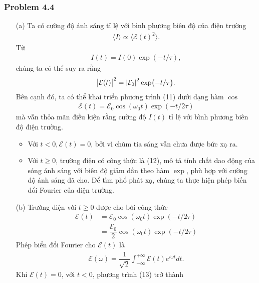 \documentclass{report}
\newcommand{\f}[2]{\dfrac{#1}{#2}}
\begin{document}
\subsubsection*{Problem 4.4}
\begin{enumerate}
	\item[(a)] Ta có cường độ ánh sáng tỉ lệ với bình phương biên độ của điện trường
	      \begin{align}
		      \langle I \rangle \propto  \langle \mathcal{E}(t)^2 \rangle.
	      \end{align}
	      Từ
	      \begin{align}
		      I(t) = I(0) \exp(-t/\tau),
	      \end{align}
	      chúng ta có thể suy ra rằng
	      \begin{align}
		      \abs{\mathcal{E}(t)}^2 = \abs{\mathcal{E}_0}^2 \exp(-t/\tau).
	      \end{align}
	      Bên cạnh đó, ta có thể khai triển phương trình (11) dưới dạng hàm $\cos$
	      \begin{align}
		      \mathcal{E}(t) = \mathcal{E}_0 \cos(\omega_0 t) \exp(-t/2\tau)
	      \end{align}
	      mà vẫn thỏa mãn điều kiện rằng cường độ $I(t)$ tỉ lệ với bình phương biên độ điện trường.
	      \begin{itemize}
		      \item Với $t<0, \mathcal{E}(t) = 0$, bởi vì chùm tia sáng vẫn chưa được bức xạ ra.
		      \item Với $t \geq 0$, trường điện có công thức là (12), mô tả tính chất dao động của sóng ánh sáng với biên độ giảm dần theo hàm $\exp$, phù hợp với cường độ ánh sáng đã cho. Để tìm phổ phát xạ, chúng ta thực hiện phép biến đổi Fourier của điện trường.
	      \end{itemize}
	\item[(b)] Trường điện với $t \geq 0$ được cho bởi công thức
	      \begin{align*}
		      \mathcal{E}(t)
		       & = \mathcal{E}_0 \cos(\omega_0 t) \exp(-t/2\tau)        \\
		       & = \f{\mathcal{E}_0}{2} \cos(\omega_0 t) \exp(-t/2\tau)
	      \end{align*}
	      Phép biển đổi Fourier cho $\mathcal{E}(t)$ là
	      \begin{align}
		      \mathcal{E}(\omega) = \f{1}{\sqrt{2}} \int_{-\infty}^{+\infty} \mathcal{E}(t) e^{i\omega t} dt.
	      \end{align}
	      Khi $\mathcal{E}(t) = 0$, với $t < 0$, phương trình (13) trở thành

\end{enumerate}
\end{document}
